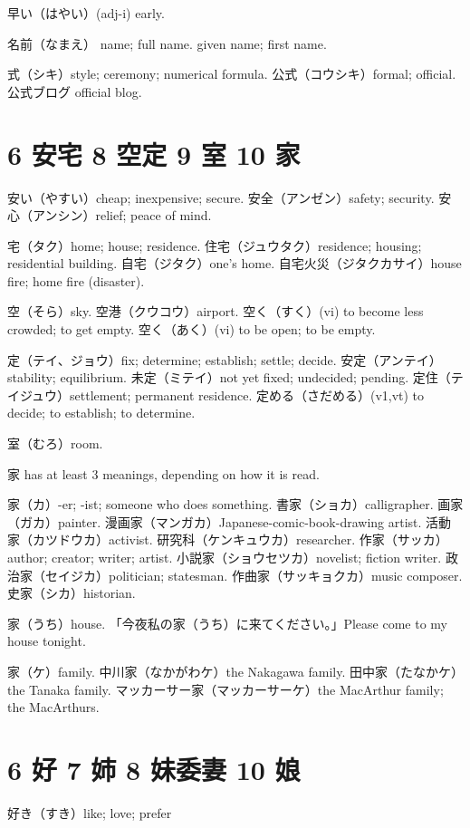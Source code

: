 早い（はやい）(adj-i) early.

名前（なまえ）
name; full name.
given name; first name.

式（シキ）style; ceremony; numerical formula.
公式（コウシキ）formal; official.
公式ブログ official blog.

\section{6 安宅 8 空定 9 室 10 家}

安い（やすい）cheap; inexpensive; secure.
安全（アンゼン）safety; security.
安心（アンシン）relief; peace of mind.

宅（タク）home; house; residence.
住宅（ジュウタク）residence; housing; residential building.
自宅（ジタク）one's home.
自宅火災（ジタクカサイ）house fire; home fire (disaster).

空（そら）sky.
空港（クウコウ）airport.
空く（すく）(vi) to become less crowded; to get empty.
空く（あく）(vi) to be open; to be empty.

定（テイ、ジョウ）fix; determine; establish; settle; decide.
安定（アンテイ）stability; equilibrium.
未定（ミテイ）not yet fixed; undecided; pending.
定住（テイジュウ）settlement; permanent residence.
定める（さだめる）(v1,vt) to decide; to establish; to determine.

室（むろ）room.

家 has at least 3 meanings, depending on how it is read.

家（カ）-er; -ist; someone who does something.
書家（ショカ）calligrapher.
画家（ガカ）painter.
漫画家（マンガカ）Japanese-comic-book-drawing artist.
活動家（カツドウカ）activist.
研究科（ケンキュウカ）researcher.
作家（サッカ）author; creator; writer; artist.
小説家（ショウセツカ）novelist; fiction writer.
政治家（セイジカ）politician; statesman.
作曲家（サッキョクカ）music composer.
史家（シカ）historian.

家（うち）house.
「今夜私の家（うち）に来てください。」Please come to my house tonight.

家（ケ）family.
中川家（なかがわケ）the Nakagawa family.
田中家（たなかケ）the Tanaka family.
マッカーサー家（マッカーサーケ）the MacArthur family; the MacArthurs.

\section{6 好 7 姉 8 妹委妻 10 娘}

好き（すき）like; love; prefer

